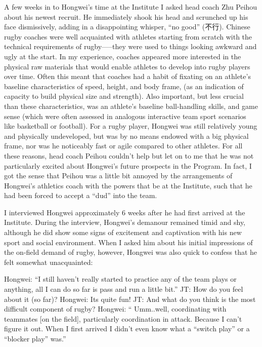 A few weeks in to Hongwei’s time at the Institute I asked head coach Zhu Peihou about his newest recruit.  He immediately shook his head and scrunched up his face dismissively, adding in a disappointing whisper, ``no good'' (不行).  Chinese rugby coaches were well acquainted with athletes starting from scratch with the technical requirements of rugby—--they were used to things looking awkward and ugly at the start.  In my experience, coaches appeared more interested in the physical raw materials that would enable athletes to develop into rugby players over time.  Often this meant that coaches had a habit of fixating on an athlete's baseline characteristics of speed, height, and body frame, (as an indication of capacity to build physical size and strength).  Also important, but less crucial than these characteristics, was an athlete’s baseline ball-handling skills, and game sense (which were often assessed in analogous interactive team sport scenarios like basketball or football).  For a rugby player, Hongwei was still relatively young and physically undeveloped, but was by no means endowed with a big physical frame, nor was he noticeably fast or agile compared to other athletes.  For all these reasons, head coach Peihou couldn’t help but let on to me that he was not particularly excited about Hongwei's future prospects in the Program.  In fact, I got the sense that Peihou was a little bit annoyed by the arrangements of Hongwei’s athletics coach with the powers that be at the Institute, such that he had been forced to accept a ``dud'' into the team.

I interviewed Hongwei approximately 6 weeks after he had first arrived at the Institute.  During the interview, Hongwei's  demanour remained timid and shy, although he did show some signs of excitement and captivation with his new sport and social environment.  When I asked him about his initial impressions of the on-field demand of rugby, however, Hongwei was also quick to confess that he felt somewhat unacquainted:

Hongwei: ``I still haven’t really started to practice any of the team plays or anything, all I can do so far is pass and run a little bit.''
JT: How do you feel about it (so far)?
Hongwei: Its quite fun!
JT: And what do you think is the most difficult component of rugby?
Hongwei: `` Umm..well, coordinating with teammates [on the field], particularly coordination in attack.  Because I can't figure it out. When I first arrived I didn’t even know what a ``switch play'' or a ``blocker play'' was.''

